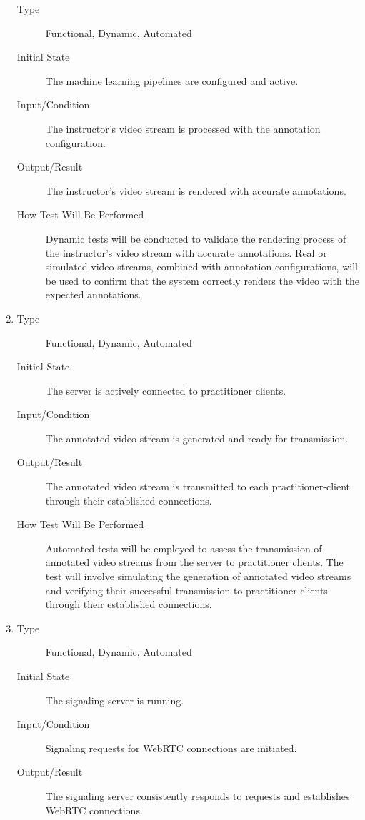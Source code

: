 \documentclass[12pt, titlepage]{article}
\begin{document}
\begin{enumerate}[FR-T1]
\begin{description}
  \item[Type] Functional, Dynamic, Automated
  \item[Initial State] The machine learning pipelines are configured and active.
  \item[Input/Condition] The instructor's video stream is processed with the
    annotation configuration.
  \item[Output/Result] The instructor's video stream is rendered with accurate
    annotations.
  \item[How Test Will Be Performed] Dynamic tests will be conducted to validate the
    rendering process of the instructor's video stream with accurate
    annotations. Real or simulated video streams, combined with annotation
    configurations, will be used to confirm that the system correctly renders
    the video with the expected annotations.
  \end{description}
\item \label{FRT10}
  \begin{description}
  \item[Type] Functional, Dynamic, Automated
  \item[Initial State] The server is actively connected to practitioner clients.
  \item[Input/Condition] The annotated video stream is generated and ready for
    transmission.
  \item[Output/Result] The annotated video stream is transmitted to each
    practitioner-client through their established connections.
  \item[How Test Will Be Performed] Automated tests will be employed to assess
    the transmission of annotated video streams from the server to practitioner
    clients. The test will involve simulating the generation of annotated video
    streams and verifying their successful transmission to practitioner-clients
    through their established connections.
  \end{description}
\item \label{FRT11}
  \begin{description}
  \item[Type] Functional, Dynamic, Automated
  \item[Initial State] The signaling server is running.
  \item[Input/Condition] Signaling requests for WebRTC connections are initiated.
  \item[Output/Result] The signaling server consistently responds to requests and
    establishes WebRTC connections.

\end{description}
\end{enumerate}
\end{document}
